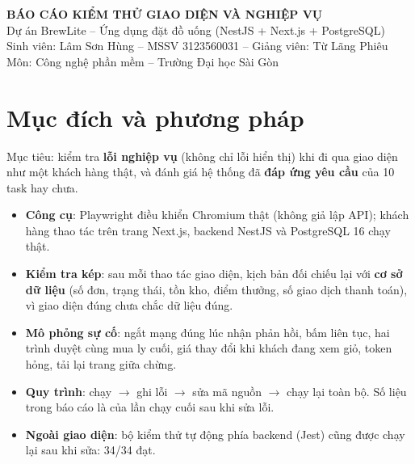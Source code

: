 \documentclass[a4paper,11pt]{article}
\begin{document}
\begin{center}
{\Large\bfseries\color{brew} BÁO CÁO KIỂM THỬ GIAO DIỆN VÀ NGHIỆP VỤ}\\[3pt]
{\large Dự án BrewLite -- Ứng dụng đặt đồ uống (NestJS + Next.js + PostgreSQL)}\\[3pt]
Sinh viên: Lâm Sơn Hùng -- MSSV 3123560031 -- Giảng viên: Từ Lãng Phiêu\\
Môn: Công nghệ phần mềm -- Trường Đại học Sài Gòn
\end{center}

\section{Mục đích và phương pháp}
Mục tiêu: kiểm tra \textbf{lỗi nghiệp vụ} (không chỉ lỗi hiển thị) khi đi qua giao diện như một khách hàng thật, và đánh giá hệ thống đã \textbf{đáp ứng yêu cầu} của 10 task hay chưa.
\begin{itemize}
\item \textbf{Công cụ}: Playwright điều khiển Chromium thật (không giả lập API); khách hàng thao tác trên trang Next.js, backend NestJS và PostgreSQL 16 chạy thật.
\item \textbf{Kiểm tra kép}: sau mỗi thao tác giao diện, kịch bản đối chiếu lại với \textbf{cơ sở dữ liệu} (số đơn, trạng thái, tồn kho, điểm thưởng, số giao dịch thanh toán), vì giao diện đúng chưa chắc dữ liệu đúng.
\item \textbf{Mô phỏng sự cố}: ngắt mạng đúng lúc nhận phản hồi, bấm liên tục, hai trình duyệt cùng mua ly cuối, giá thay đổi khi khách đang xem giỏ, token hỏng, tải lại trang giữa chừng.
\item \textbf{Quy trình}: chạy $\to$ ghi lỗi $\to$ sửa mã nguồn $\to$ chạy lại toàn bộ. Số liệu trong báo cáo là của lần chạy cuối sau khi sửa lỗi.
\item \textbf{Ngoài giao diện}: bộ kiểm thử tự động phía backend (Jest) cũng được chạy lại sau khi sửa: 34/34 đạt.
\end{itemize}
\end{document}

